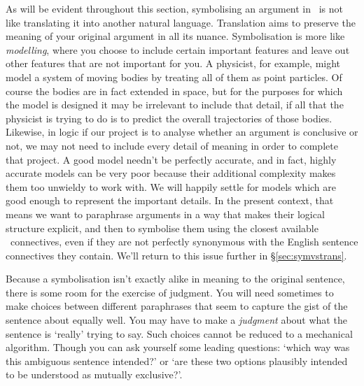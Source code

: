 As will be evident throughout this section, symbolising an argument in \TFL\ is not like translating it into another natural language. Translation aims to preserve the meaning of your original argument in all its nuance. Symbolisation is more like \emph{modelling}, where you choose to include certain important features and leave out other features that are not important for you. A physicist, for example, might model a system of moving bodies by treating all of them as point particles. Of course the bodies are in fact extended in space, but for the purposes for which the model is designed it may be irrelevant to include that detail, if all that the physicist is trying to do is to predict the overall trajectories of those bodies. Likewise, in logic if our project is to analyse whether an argument is conclusive or not, we may not need to include every detail of meaning in order to complete that project. A good model needn't be perfectly accurate, and in fact, highly accurate models can be very poor because their additional complexity makes them too unwieldy to work with. We will happily settle for models which are good enough to represent the important details. In the present context, that means we want to paraphrase arguments in a way that makes their logical structure explicit, and then to symbolise them using the closest available \TFL\ connectives, even if they are not perfectly synonymous with the English sentence connectives they contain. We'll return to this issue further in §\ref{sec:symvstrans}.

Because a symbolisation isn't exactly alike in meaning to the original sentence, there is some room for the exercise of judgment. You will need sometimes to make choices between different paraphrases that seem to capture the gist of the sentence about equally well. You may have to make a \emph{judgment} about what the sentence is `really' trying to say. Such choices cannot be reduced to a mechanical algorithm. Though you can ask yourself some leading questions: ‘which way was this ambiguous sentence intended?’ or ‘are these two options plausibly intended to be understood as mutually exclusive?’.


